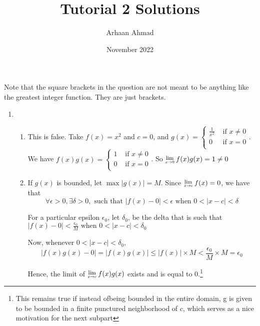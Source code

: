\documentclass{article}
\title{Tutorial 2 Solutions}
\author{Arhaan Ahmad}
\date{November 2022}
\newcommand{\Lim}[1]{\raisebox{0.5ex}{\scalebox{0.8}{$\displaystyle \lim_{#1}\;$}}}
\begin{document}
        \maketitle
                Note that the square brackets in the question are not meant to be anything like the greatest integer function. They are just brackets.
        \begin{enumerate}
                \item \begin{enumerate}
                        \item This is false. Take $f(x) = x^2$ and $c=0$, and 
                                $g(x) = \begin{cases}
                                        \frac{1}{x^2} & \text{ if } x \neq 0\\
                                        0 & \text{ if } x = 0\\
                                \end{cases}$. 
                                We have 
                                $f(x)g(x) = \begin{cases}
                                        1 & \text{ if } x \neq 0\\
                                        0 & \text{ if } x = 0\\
                                \end{cases}$. 
                                So $\Lim{x\to 0} f(x)g(x) = 1 \neq 0$
                         \item If $g(x)$ is bounded, let $\max |g(x)| = M$. 
                                 Since $\Lim{x\to c} f(x) = 0$, we have that 
                                 $$\forall \epsilon > 0, \exists \delta > 0, \text{ such that } |f(x) - 0 | < \epsilon \text{ when } 0 < |x-c| < \delta$$


                                 For a particular epsilon $\epsilon_0$, let $\delta_0$, be the delta that is such that 
                                 $|f(x) - 0 | < \frac{\epsilon_0}{M} \text{ when } 0 < |x-c| < \delta_0$

                                 Now, whenever $0 < |x-c| < \delta_0$, 
                                 $$|f(x)g(x) - 0| = |f(x)g(x)| \leq |f(x)| \times M < \frac{\epsilon_0}{M} \times M = \epsilon_0$$
                                 
                                 Hence, the limit of $\Lim{x\to c}f(x)g(x)$ exists and is equal to $0$.\footnote{This remains true if instead ofbeing bounded in the entire domain, g is given to be bounded in a finite punctured neighborhood of $c$, which serves as a nice motivation for the next subpart} 
 

\end{enumerate}
\end{enumerate}
\end{document}
